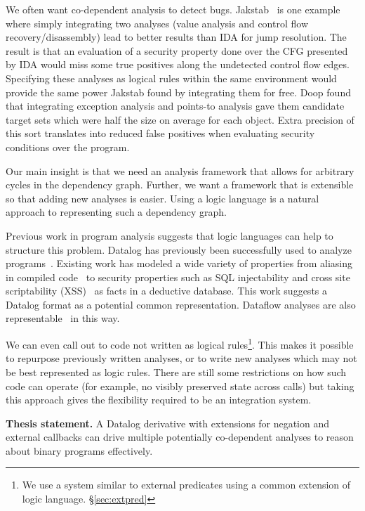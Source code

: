 We often want co-dependent analysis to detect bugs.
Jakstab~\cite{jakstab} is one example where simply integrating two analyses (value analysis and control flow recovery/disassembly) lead to better results than IDA\cite{ida} for jump resolution.
The result is that an evaluation of a security property done over the CFG presented by IDA would miss some true positives along the undetected control flow edges.
Specifying these analyses as logical rules within the same environment would provide the same power Jakstab found by integrating them for free.
Doop\cite{doop1} found that integrating exception analysis and points-to analysis gave them candidate target sets which were half the size on average for each object.
Extra precision of this sort translates into reduced false positives when evaluating security conditions over the program.

Our main insight is that we need an analysis framework that allows for arbitrary cycles in the dependency graph.
Further, we want a framework that is extensible so that adding new analyses is easier.
Using a logic language is a natural approach to representing such a dependency graph.

Previous work in program analysis suggests that logic languages can help to structure this problem.
Datalog has previously been successfully used to analyze programs~\cite{lam2005,brumley2006,alpuente2011,doop1,bddbddb}.
Existing work has modeled a wide variety of properties from aliasing in compiled code~\cite{brumley2006} to security properties such as SQL injectability and cross site scriptability (XSS)~\cite{lam2005} as facts in a deductive database.
This work suggests a Datalog format as a potential common representation.
Dataflow analyses are also representable~\cite{mcallester2002} in this way.

We can even call out to code not written as logical rules\footnote{We use a system similar to external predicates using a common extension of logic language. \S\ref{sec:extpred}}.
This makes it possible to repurpose previously written analyses, or to write new analyses which may not be best represented as logic rules.
There are still some restrictions on how such code can operate (for example, no visibly preserved state across calls) but taking this approach gives the flexibility required to be an integration system.

\begin{inset}
{\bf Thesis statement.}
A Datalog derivative with extensions for negation and external callbacks can drive multiple potentially co-dependent analyses to reason about binary programs effectively.
\end{inset}

